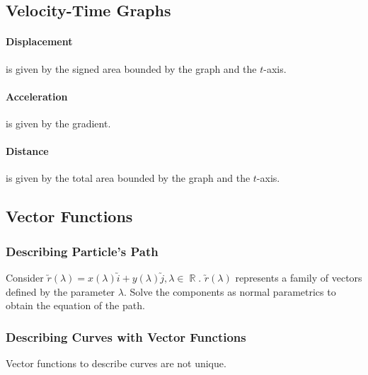 \documentclass[a4paper,twoside,10pt]{article}
\DeclareMathOperator\R{\mathbb{R}}
\begin{document}
		\subsection{Velocity-Time Graphs}
			\paragraph{Displacement} is given by the signed area bounded by the graph and the $t$-axis.
			\paragraph{Acceleration} is given by the gradient.
			\paragraph{Distance} is given by the total area bounded by the graph and the $t$-axis.
		\subsection{Vector Functions}
			\subsubsection{Describing Particle's Path}
				Consider $\utilde{r}(\lambda)=x(\lambda)\utilde{i}+y(\lambda)\utilde{j},\lambda\in\R$. $\utilde{r}(\lambda)$ represents a family of vectors defined by the parameter $\lambda$. Solve the components as normal parametrics to obtain the equation of the path.
			\subsubsection{Describing Curves with Vector Functions}
				Vector functions to describe curves are not unique.
\end{document}
